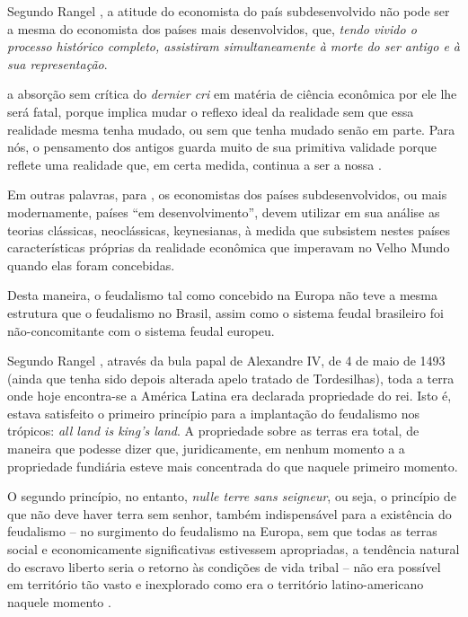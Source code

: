 \documentclass[
	12pt,				%
	oneside,			%
	a4paper,			%
	chapter=TITLE,		%
	section=TITLE,		%
	english,			%
	brazil				%
	]{abntex2}
\begin{document}
Segundo Rangel \autocite*[206]{rangel1956}, a atitude do economista do país
subdesenvolvido não pode ser a mesma do economista dos países mais
desenvolvidos, que, \emph{tendo vivido o processo histórico completo, assistiram
simultaneamente à morte do ser antigo e à sua representação}.
\begin{citacao} 
a absorção sem crítica do \emph{dernier cri} em matéria de ciência econômica por
ele lhe será fatal, porque implica mudar o reflexo ideal da realidade sem que
essa realidade mesma tenha mudado, ou sem que tenha mudado senão em parte. Para
nós, o pensamento dos antigos guarda muito de sua primitiva validade porque
reflete uma realidade que, em certa medida, continua a ser a nossa
\cite[p.~206-207]{rangel1956}.
\end{citacao}
Em outras palavras, para \textcite{rangel1956}, os economistas dos países
subdesenvolvidos, ou mais modernamente, países ``em desenvolvimento'', devem
utilizar em sua análise as teorias clássicas, neoclássicas, keynesianas, à
medida que subsistem nestes países características próprias da realidade
econômica que imperavam no Velho Mundo quando elas foram concebidas.

Desta maneira, o feudalismo tal como concebido na Europa não teve a mesma
estrutura que o feudalismo no Brasil, assim como o sistema feudal brasileiro foi
não-concomitante com o sistema feudal europeu.

Segundo Rangel \autocite*[726]{rangel1989}, através da bula papal de Alexandre IV, de
4 de maio de 1493 (ainda que tenha sido depois alterada apelo tratado de
Tordesilhas), toda a terra onde hoje encontra-se a América Latina era declarada
propriedade do rei. Isto é, estava satisfeito o primeiro princípio para a
implantação do feudalismo nos trópicos: \emph{all land is king's land}. A propriedade
sobre as terras era total, de maneira que podesse dizer que, juridicamente, em
nenhum momento a a propriedade fundiária esteve mais concentrada do que naquele
primeiro momento.

O segundo princípio, no entanto, \emph{nulle terre sans seigneur}, ou seja, o
princípio de que não deve haver terra sem senhor, também indispensável para a
existência do feudalismo -- no surgimento do feudalismo na Europa, sem que todas
as terras social e economicamente significativas estivessem apropriadas, a
tendência natural do escravo liberto seria o retorno às condições de vida
tribal -- não era possível em território tão vasto e inexplorado como era o
território latino-americano naquele momento \autocite[726]{rangel1989}.
\end{document}

